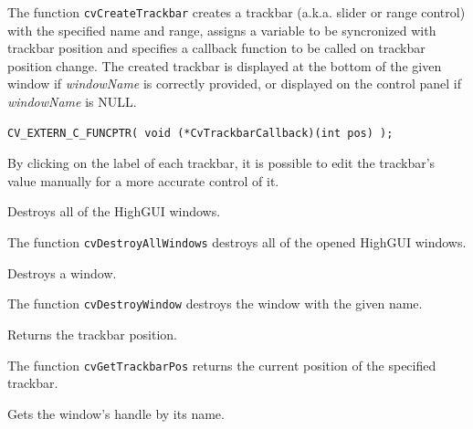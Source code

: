 The function \texttt{cvCreateTrackbar} creates a trackbar (a.k.a. slider or range control) with the specified name and range, assigns a variable to be syncronized with trackbar position and specifies a callback function to be called on trackbar position change. The created trackbar is displayed at the bottom of the given window if \emph{windowName} is correctly provided, or displayed on the control panel if \emph{windowName} is NULL.
\begin{lstlisting}
CV_EXTERN_C_FUNCPTR( void (*CvTrackbarCallback)(int pos) );
\end{lstlisting}

By clicking on the label of each trackbar, it is possible to edit the trackbar's value manually for a more accurate control of it.

Destroys all of the HighGUI windows.


The function \texttt{cvDestroyAllWindows} destroys all of the opened HighGUI windows.

Destroys a window.


\begin{description}
\end{description}

The function \texttt{cvDestroyWindow} destroys the window with the given name.

Returns the trackbar position.


\begin{description}
\end{description}

The function \texttt{cvGetTrackbarPos} returns the current position of the specified trackbar.

Gets the window's handle by its name.


